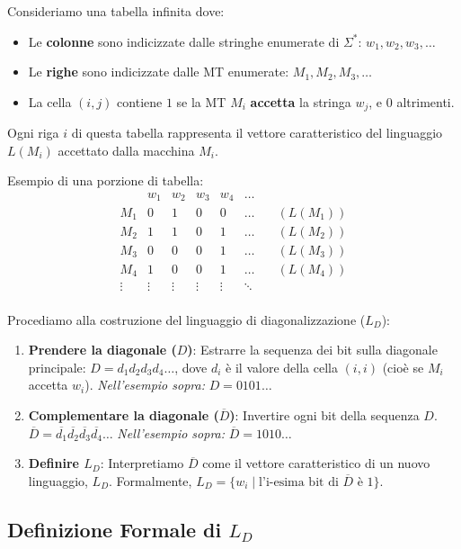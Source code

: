 \documentclass[a4paper]{article}
\begin{document}
Consideriamo una tabella infinita dove:
\begin{itemize}
    \item Le \textbf{colonne} sono indicizzate dalle stringhe enumerate di $\Sigma^*$: $w_1, w_2, w_3, \dots$
    \item Le \textbf{righe} sono indicizzate dalle MT enumerate: $M_1, M_2, M_3, \dots$
    \item La cella $(i, j)$ contiene $1$ se la MT $M_i$ \textbf{accetta} la stringa $w_j$, e $0$ altrimenti.
\end{itemize}
Ogni riga $i$ di questa tabella rappresenta il vettore caratteristico del linguaggio $L(M_i)$ accettato dalla macchina $M_i$.

Esempio di una porzione di tabella:
\[
\begin{array}{c|cccccc}
        & w_1 & w_2 & w_3 & w_4 & \dots \\
    \hline
    M_1 & 0 & 1 & 0 & 0 & \dots & \quad (L(M_1)) \\
    M_2 & 1 & 1 & 0 & 1 & \dots & \quad (L(M_2)) \\
    M_3 & 0 & 0 & 0 & 1 & \dots & \quad (L(M_3)) \\
    M_4 & 1 & 0 & 0 & 1 & \dots & \quad (L(M_4)) \\
    \vdots & \vdots & \vdots & \vdots & \vdots & \ddots \\
\end{array}
\]

Procediamo alla costruzione del linguaggio di diagonalizzazione ($L_D$):
\begin{enumerate}
    \item \textbf{Prendere la diagonale ($D$)}: Estrarre la sequenza dei bit sulla diagonale principale: $D = d_1 d_2 d_3 d_4 \dots$, dove $d_i$ è il valore della cella $(i,i)$ (cioè se $M_i$ accetta $w_i$).
    \textit{Nell'esempio sopra:} $D = 0101\dots$
    \item \textbf{Complementare la diagonale ($\overline{D}$)}: Invertire ogni bit della sequenza $D$.
    $\overline{D} = \overline{d_1} \overline{d_2} \overline{d_3} \overline{d_4} \dots$
    \textit{Nell'esempio sopra:} $\overline{D} = 1010\dots$
    \item \textbf{Definire $L_D$}: Interpretiamo $\overline{D}$ come il vettore caratteristico di un nuovo linguaggio, $L_D$.
    Formalmente, $L_D = \{ w_i \mid \text{l'i-esima bit di } \overline{D} \text{ è } 1 \}$.
\end{enumerate}

\subsection{Definizione Formale di $L_D$}
\end{document}
